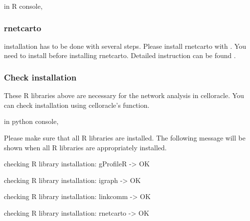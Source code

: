 \documentclass[letterpaper,10pt,english]{sphinxmanual}
\begin{document}
in R console,

%
\begin{sphinxVerbatim}[commandchars=\\\{\}]
\end{sphinxVerbatim}


\subsubsection{rnetcarto}
\label{\detokenize{installation/index:id11}}
 installation has to be done with several steps. Please install rnetcarto with  .
You need to install  before installing rnetcarto. Detailed instruction can be found  .


\subsubsection{Check installation}
\label{\detokenize{installation/index:check-installation}}
These R libraries above are necessary for the network analysis in celloracle. You can check installation using celloracle’s function.

in python console,

%
\begin{sphinxVerbatim}[commandchars=\\\{\}]
   
\end{sphinxVerbatim}

Please make sure that all R libraries are installed. The following message will be shown when all R libraries are appropriately installed.

\begin{DUlineblock}{0em}
\item[] checking R library installation: gProfileR -\textgreater{} OK
\item[] checking R library installation: igraph -\textgreater{} OK
\item[] checking R library installation: linkcomm -\textgreater{} OK
\item[] checking R library installation: rnetcarto -\textgreater{} OK
\end{DUlineblock}
\end{document}
